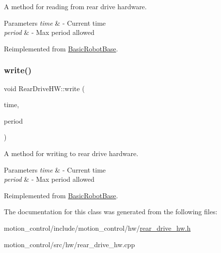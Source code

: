 A method for reading from rear drive hardware. 


\begin{DoxyParams}{Parameters}
{\em time} & -\/ Current time \\
\hline
{\em period} & -\/ Max period allowed \\
\hline
\end{DoxyParams}


Reimplemented from \hyperlink{classBasicRobotBase_a64bb2c7bed72e98fb62a37d6beb4fe5a}{Basic\+Robot\+Base}.

\mbox{\label{classRearDriveHW_a36461317b3f595464ef080259bc21fae}} 
\subsubsection{\texorpdfstring{write()}{write()}}
{\footnotesize\ttfamily void Rear\+Drive\+H\+W\+::write (\begin{DoxyParamCaption}\item[{const ros\+::\+Time \&}]{time,  }\item[{const ros\+::\+Duration \&}]{period }\end{DoxyParamCaption})\hspace{0.3cm}{\ttfamily [virtual]}}



A method for writing to rear drive hardware. 


\begin{DoxyParams}{Parameters}
{\em time} & -\/ Current time \\
\hline
{\em period} & -\/ Max period allowed \\
\hline
\end{DoxyParams}


Reimplemented from \hyperlink{classBasicRobotBase_afbc6ef4347fc05e053391692a9e1bc24}{Basic\+Robot\+Base}.



The documentation for this class was generated from the following files\+:\begin{DoxyCompactItemize}
\item 
motion\+\_\+control/include/motion\+\_\+control/hw/\hyperlink{rear__drive__hw_8h}{rear\+\_\+drive\+\_\+hw.\+h}\item 
motion\+\_\+control/src/hw/rear\+\_\+drive\+\_\+hw.\+cpp\end{DoxyCompactItemize}
